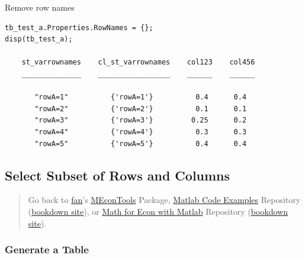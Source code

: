 \documentclass[
]{book}
\begin{document}
Remove row names

\begin{verbatim}
tb_test_a.Properties.RowNames = {};
disp(tb_test_a);

    st_varrownames    cl_st_varrownames    col123    col456
    ______________    _________________    ______    ______

       "rowA=1"          {'rowA=1'}          0.4      0.4  
       "rowA=2"          {'rowA=2'}          0.1      0.1  
       "rowA=3"          {'rowA=3'}         0.25      0.2  
       "rowA=4"          {'rowA=4'}          0.3      0.3  
       "rowA=5"          {'rowA=5'}          0.4      0.4
\end{verbatim}

\hypertarget{select-subset-of-rows-and-columns}{%
\subsection{Select Subset of Rows and Columns}\label{select-subset-of-rows-and-columns}}

\begin{quote}
Go back to \href{http://fanwangecon.github.io/}{fan}'s \href{https://fanwangecon.github.io/MEconTools/}{MEconTools} Package, \href{https://fanwangecon.github.io/M4Econ/}{Matlab Code Examples} Repository (\href{https://fanwangecon.github.io/M4Econ/bookdown}{bookdown site}), or \href{https://fanwangecon.github.io/Math4Econ/}{Math for Econ with Matlab} Repository (\href{https://fanwangecon.github.io/Math4Econ/bookdown}{bookdown site}).
\end{quote}

\hypertarget{generate-a-table}{%
\subsubsection{Generate a Table}\label{generate-a-table}}
\end{document}
